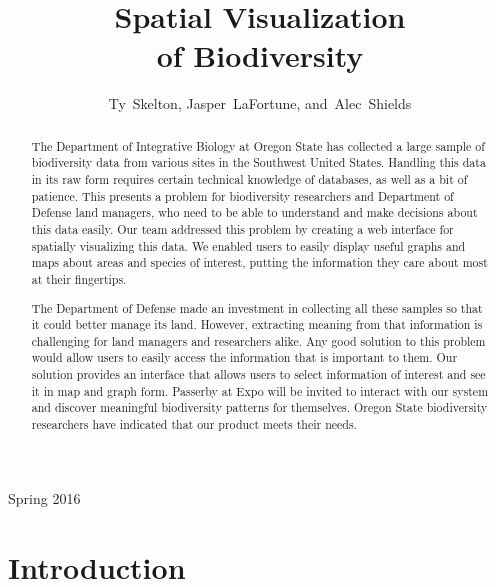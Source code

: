 \documentclass[10pt,draftclsnofoot,onecolumn]{IEEEtran}
\begin{document}
\singlespacing
\title{Spatial Visualization\\ of Biodiversity}

\author{Ty~Skelton,
        Jasper~LaFortune,
        and~Alec~Shields}%

%
{Spring 2016}

\maketitle

\begin{abstract} %
The Department of Integrative Biology at Oregon State has collected a large sample of biodiversity data from various sites in the Southwest United States.
Handling this data in its raw form requires certain technical knowledge of databases, as well as a bit of patience.
This presents a problem for biodiversity researchers and Department of Defense land managers, who need to be able to understand and make decisions about this data easily.
Our team addressed this problem by creating a web interface for spatially visualizing this data.
We enabled users to easily display useful graphs and maps about areas and species of interest, putting the information they care about most at their fingertips.

The Department of Defense made an investment in collecting all these samples so that it could better manage its land.
However, extracting meaning from that information is challenging for land managers and researchers alike.
Any good solution to this problem would allow users to easily access the information that is important to them.
Our solution provides an interface that allows users to select information of interest and see it in map and graph form.
Passerby at Expo will be invited to interact with our system and discover meaningful biodiversity patterns for themselves.
Oregon State biodiversity researchers have indicated that our product meets their needs.

\end{abstract}
\IEEEpeerreviewmaketitle

\newpage
\tableofcontents
\newpage
{}
\section{Introduction} %

\end{document}
